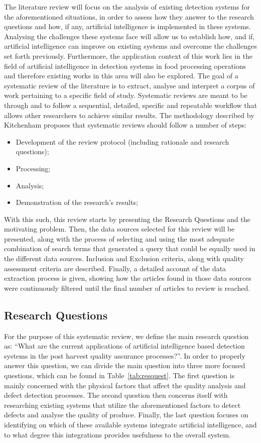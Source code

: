 \documentclass[conference]{IEEEtran}
\begin{document}
The literature review will focus on the analysis of existing detection systems for the aforementioned situations, in order to assess how they answer to the research questions and how, if any, artificial intelligence is implemented in these systems. Analysing the challenges these systems face will allow us to establish how, and if, artificial intelligence can improve on existing systems and overcome the challenges set forth previously. Furthermore, the application context of this work lies in the field of artificial intelligence in detection systems in food processing operations and therefore existing works in this area will also be explored.
The goal of a systematic review of the literature is to extract, analyse and interpret a corpus of work pertaining to a specific field of study. Systematic reviews are meant to be through and to follow a sequential, detailed, specific and repeatable workflow that allows other researchers to achieve similar results. The methodology described by Kitchenham \cite{kitch} proposes that systematic reviews should follow a number of steps:
\begin{itemize}
	\item Development of the review protocol (including rationale and research questions);
	\item Processing;
	\item Analysis;
	\item Demonstration of the research's results;
\end{itemize}
With this such, this review starts by presenting the Research Questions and the motivating problem. Then, the data sources selected for this review will be presented, along with the process of selecting and using the most adequate combination of search terms that generated a query that could be equally used in the different data sources. Inclusion and Exclusion criteria, along with quality assessment criteria are described. Finally, a detailed account of the data extraction process is given, showing how the articles found in those data sources were continuously filtered until the final number of articles to review is reached.

\subsection{Research Questions}

For the purpose of this systematic review, we define the main research question as: ``What are the current applications of artificial intelligence based detection systems in the post harvest quality assurance processes?''. In order to properly answer this question, we can divide the main question into three more focused questions, which can be found in Table~\ref{tab:resquest}. The first question is mainly concerned with the physical factors that affect the quality analysis and defect detection processes. The second question then concerns itself with researching existing systems that utilize the aforementioned factors to detect defects and analyse the quality of produce. Finally, the last question focuses on identifying on which of these available systems integrate artificial intelligence, and to what degree this integrations provides usefulness to the overall system.
\end{document}
